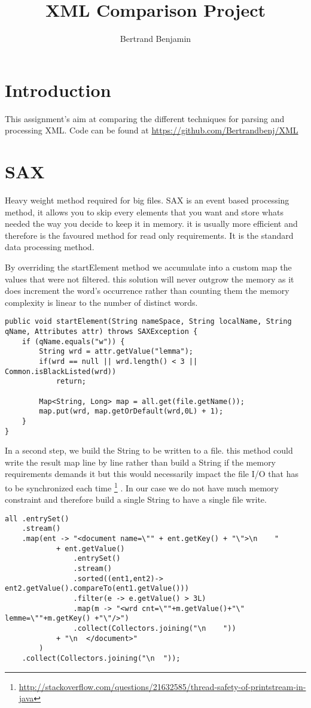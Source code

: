 \documentclass{article}
\title{XML Comparison Project}
\author{Bertrand Benjamin}
\begin{document}
\maketitle


\section*{Introduction} %
This assignment's aim at comparing the different techniques for parsing and processing XML. 
Code can be found at \url{https://github.com/Bertrandbenj/XML}

\section*{SAX}
Heavy weight method required for big files. SAX is an event based processing method, it allows you to skip every elements that you want and store whats needed the way you decide to keep it in memory. it is usually more efficient and therefore is the favoured method for read only requirements. It is the standard data processing method.

By overriding the startElement method we accumulate into a custom map the values that were not filtered. this solution will never outgrow the memory as it does increment the word's occurrence rather than counting them the memory complexity is linear to the number of distinct words.
\begin{verbatim}
public void startElement(String nameSpace, String localName, String qName, Attributes attr) throws SAXException {
    if (qName.equals("w")) {
        String wrd = attr.getValue("lemma");
        if(wrd == null || wrd.length() < 3 || Common.isBlackListed(wrd))
            return;
		
        Map<String, Long> map = all.get(file.getName());
        map.put(wrd, map.getOrDefault(wrd,0L) + 1);
    }
}
\end{verbatim}

In a second step, we build the String to be written to a file. this method could write the result map line by line rather than build a String if the memory requirements demands it but this would necessarily impact the file I/O that has to be synchronized each time \footnote{\url{http://stackoverflow.com/questions/21632585/thread-safety-of-printstream-in-java}} . 
In our case we do not have much memory constraint and therefore build a single String to have a single file write.
\begin{verbatim}
all .entrySet()
    .stream()
    .map(ent -> "<document name=\"" + ent.getKey() + "\">\n    " 
            + ent.getValue()
                .entrySet()
                .stream()
                .sorted((ent1,ent2)-> ent2.getValue().compareTo(ent1.getValue()))
                .filter(e -> e.getValue() > 3L)
                .map(m -> "<wrd cnt=\""+m.getValue()+"\" lemme=\""+m.getKey() +"\"/>")
                .collect(Collectors.joining("\n    "))
            + "\n  </document>"
        )
    .collect(Collectors.joining("\n  "));
\end{verbatim}
\end{document}
